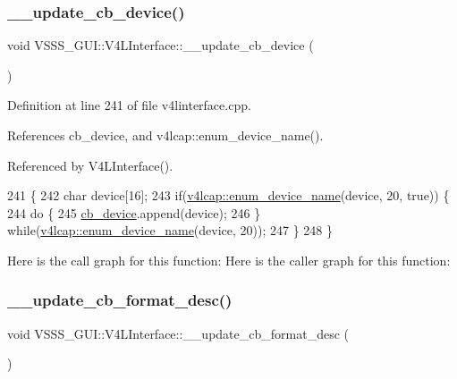 \subsubsection{\texorpdfstring{\+\_\+\+\_\+update\+\_\+cb\+\_\+device()}{\_\_update\_cb\_device()}}
{\footnotesize\ttfamily void V\+S\+S\+S\+\_\+\+G\+U\+I\+::\+V4\+L\+Interface\+::\+\_\+\+\_\+update\+\_\+cb\+\_\+device (\begin{DoxyParamCaption}{ }\end{DoxyParamCaption})\hspace{0.3cm}{\ttfamily [private]}}



Definition at line 241 of file v4linterface.\+cpp.



References cb\+\_\+device, and v4lcap\+::enum\+\_\+device\+\_\+name().



Referenced by V4\+L\+Interface().


\begin{DoxyCode}
241                                           \{
242         \textcolor{keywordtype}{char} device[16];
243         \textcolor{keywordflow}{if}(\hyperlink{classv4lcap_a4949a041b3096de1d98336eb8921b7c7}{v4lcap::enum\_device\_name}(device, 20, \textcolor{keyword}{true})) \{
244             \textcolor{keywordflow}{do} \{
245                 \hyperlink{class_v_s_s_s___g_u_i_1_1_v4_l_interface_a9aebd92fe12b9b5acc25b1113dbd022e}{cb\_device}.append(device);
246             \} \textcolor{keywordflow}{while}(\hyperlink{classv4lcap_a4949a041b3096de1d98336eb8921b7c7}{v4lcap::enum\_device\_name}(device, 20));
247         \}
248     \}
\end{DoxyCode}
Here is the call graph for this function\+:
Here is the caller graph for this function\+:
\mbox{\label{class_v_s_s_s___g_u_i_1_1_v4_l_interface_ad2da97031a8ca5d9e2d99f5a5459c267}} 
\subsubsection{\texorpdfstring{\+\_\+\+\_\+update\+\_\+cb\+\_\+format\+\_\+desc()}{\_\_update\_cb\_format\_desc()}}
{\footnotesize\ttfamily void V\+S\+S\+S\+\_\+\+G\+U\+I\+::\+V4\+L\+Interface\+::\+\_\+\+\_\+update\+\_\+cb\+\_\+format\+\_\+desc (\begin{DoxyParamCaption}{ }\end{DoxyParamCaption})\hspace{0.3cm}{\ttfamily [private]}}



